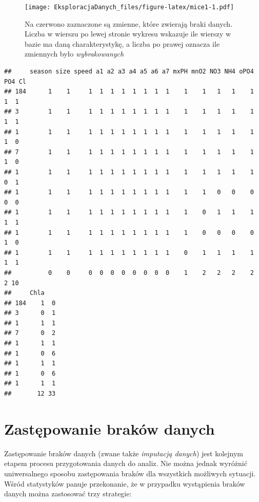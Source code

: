 \documentclass[]{book}
\theoremstyle{plain}
\theoremstyle{definition}
\theoremstyle{definition}
\theoremstyle{definition}
\theoremstyle{definition}
\theoremstyle{remark}
\begin{document}
\begin{figure}
\centering
\texttt{[image: EksploracjaDanych\_files/figure-latex/mice1-1.pdf]}
\caption{\label{fig:mice1}Na czerwono zaznaczone są zmienne, które zwierają braki danych. Liczba w wierszu po lewej stronie wykresu wskazuje ile wierszy w bazie ma daną charakterystykę, a liczba po prawej oznacza ile zmiennych było \emph{wybrakowanych}}
\end{figure}

\begin{verbatim}
##     season size speed a1 a2 a3 a4 a5 a6 a7 mxPH mnO2 NO3 NH4 oPO4 PO4 Cl
## 184      1    1     1  1  1  1  1  1  1  1    1    1   1   1    1   1  1
## 3        1    1     1  1  1  1  1  1  1  1    1    1   1   1    1   1  1
## 1        1    1     1  1  1  1  1  1  1  1    1    1   1   1    1   1  0
## 7        1    1     1  1  1  1  1  1  1  1    1    1   1   1    1   1  0
## 1        1    1     1  1  1  1  1  1  1  1    1    1   1   1    1   0  1
## 1        1    1     1  1  1  1  1  1  1  1    1    1   0   0    0   0  0
## 1        1    1     1  1  1  1  1  1  1  1    1    0   1   1    1   1  1
## 1        1    1     1  1  1  1  1  1  1  1    1    0   0   0    0   1  0
## 1        1    1     1  1  1  1  1  1  1  1    0    1   1   1    1   1  1
##          0    0     0  0  0  0  0  0  0  0    1    2   2   2    2   2 10
##     Chla   
## 184    1  0
## 3      0  1
## 1      1  1
## 7      0  2
## 1      1  1
## 1      0  6
## 1      1  1
## 1      0  6
## 1      1  1
##       12 33
\end{verbatim}

\hypertarget{zastepowanie-brakow-danych}{%
\section{Zastępowanie braków danych}\label{zastepowanie-brakow-danych}}

Zastępowanie braków danych (zwane także \emph{imputacją danych}) jest kolejnym etapem procesu przygotowania danych do analiz. Nie można jednak wyróżnić uniwersalnego sposobu zastępowania braków dla wszystkich możliwych sytuacji. Wśród statystyków panuje przekonanie, że w przypadku wystąpienia braków danych można zastosować trzy strategie:
\end{document}
